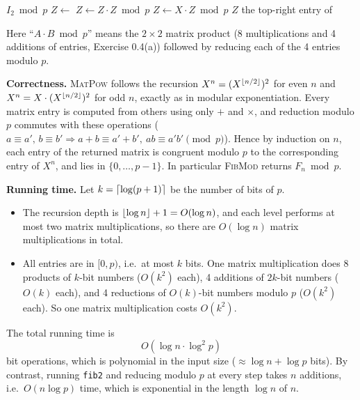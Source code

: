 \documentclass[11pt]{article}
\DeclarePairedDelimiter{\floor}{\lfloor}{\rfloor}
\DeclarePairedDelimiter{\ceil}{\lceil}{\rceil}
\theoremstyle{definition}
\begin{document}
\begin{algorithm}[H]
\caption{Computing $F_n \bmod p$}
\begin{algorithmic}[1]
 
   \State \Return $I_2 \bmod p$ \EndIf
  \State $Z\gets$ 
  \State $Z\gets Z\cdot Z \bmod p$
   \State $Z\gets X\cdot Z \bmod p$ \EndIf
  \State \Return $Z$
\EndFunction
{}
  \State \Return the top-right entry of 
\EndFunction
\end{algorithmic}
\end{algorithm}

Here ``$A\cdot B\bmod p$'' means the $2\times2$ matrix product (8 multiplications and 4 additions of
entries, Exercise 0.4(a)) followed by reducing each of the 4 entries modulo $p$.

\textbf{Correctness.} \textsc{MatPow} follows the recursion
$X^n=(X^{\floor{n/2}})^2$ for even $n$ and $X^n=X\cdot(X^{\floor{n/2}})^2$ for odd $n$, exactly as in
modular exponentiation. Every matrix entry is computed from others using only $+$ and $\times$, and
reduction modulo $p$ commutes with these operations
($a\equiv a',\,b\equiv b'\Rightarrow a+b\equiv a'+b',\ ab\equiv a'b' \pmod p$).
Hence by induction on $n$, each entry of the returned matrix is congruent modulo $p$ to the corresponding
entry of $X^n$, and lies in $\{0,\dots,p-1\}$. In particular \textsc{FibMod} returns $F_n\bmod p$.

\textbf{Running time.} Let $k=\ceil{\log(p+1)}$ be the number of bits of $p$.
\begin{itemize}[itemsep=0.2em]
\item The recursion depth is $\floor{\log n}+1=O(\log n)$, and each level performs at most two matrix
  multiplications, so there are $O(\log n)$ matrix multiplications in total.
\item All entries are in $[0,p)$, i.e.\ at most $k$ bits. One matrix multiplication does 8 products of
  $k$-bit numbers ($O(k^2)$ each), 4 additions of $2k$-bit numbers ($O(k)$ each), and 4 reductions of
  $O(k)$-bit numbers modulo $p$ ($O(k^2)$ each). So one matrix multiplication costs $O(k^2)$.
\end{itemize}
The total running time is
\[
  O(\log n\cdot\log^2 p)
\]
bit operations, which is polynomial in the input size ($\approx\log n+\log p$ bits).
By contrast, running \texttt{fib2} and reducing modulo $p$ at every step takes $n$ additions,
i.e.\ $O(n\log p)$ time, which is exponential in the length $\log n$ of $n$.
\end{document}
